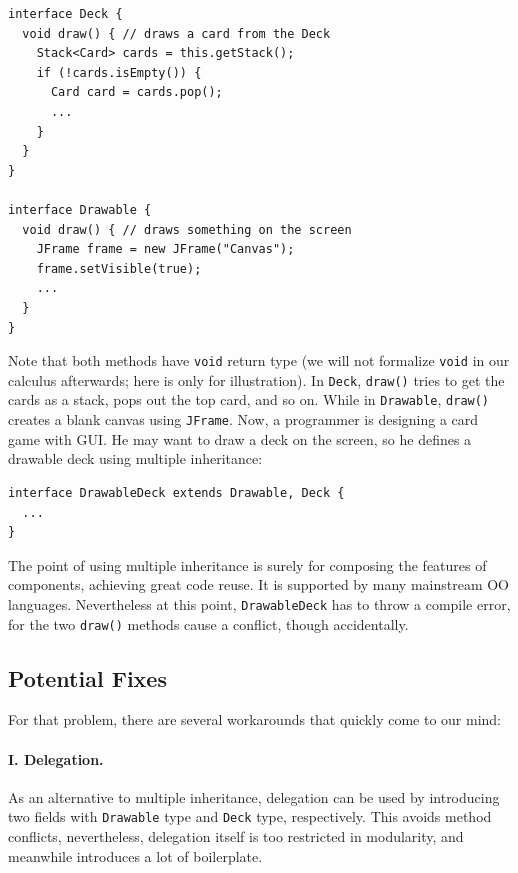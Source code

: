 \vspace{3pt}\begin{lstlisting}
interface Deck {
  void draw() { // draws a card from the Deck
    Stack<Card> cards = this.getStack();
    if (!cards.isEmpty()) {
      Card card = cards.pop();
      ...
    }
  }
}

interface Drawable {
  void draw() { // draws something on the screen
    JFrame frame = new JFrame("Canvas");
    frame.setVisible(true);
    ...
  }
}
\end{lstlisting}\vspace{3pt} 
Note that both methods have \lstinline|void| return type (we will not formalize
\lstinline|void| in our calculus afterwards; here is only for illustration). In \lstinline|Deck|, \lstinline|draw()| tries to get the cards as a stack, pops
out the top card, and so on. While in \lstinline|Drawable|, \lstinline|draw()|
creates a blank canvas using \lstinline|JFrame|. Now, a programmer is designing a
card game with GUI. He may want to draw a deck on the screen, so he defines a drawable
deck using multiple inheritance:

\vspace{3pt}\begin{lstlisting}
interface DrawableDeck extends Drawable, Deck {
  ...
} 
\end{lstlisting}\vspace{3pt}
The point of using multiple inheritance is surely for composing the features of
components, achieving great code reuse. It is supported by many mainstream OO
languages. Nevertheless at this point, \lstinline|DrawableDeck| has to throw a compile
error, for the two \lstinline|draw()| methods cause a conflict, though accidentally.

\subsection{Potential Fixes}

For that problem, there are several workarounds that quickly come to our mind:

\paragraph{I. Delegation.} As an alternative to multiple inheritance, delegation can be used by
introducing two fields with \lstinline|Drawable| type and \lstinline|Deck| type, respectively. This avoids
method conflicts, nevertheless, delegation itself is too restricted in modularity, and meanwhile
introduces a lot of boilerplate.

